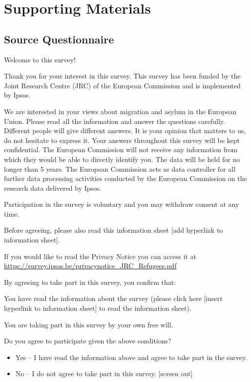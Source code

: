 \documentclass[
  12pt,
  a4paper,
]{article}
\providecommand{\tightlist}{%
  \setlength{\itemsep}{0pt}\setlength{\parskip}{0pt}}
\begin{document}
\newpage

\clearpage

\section{Supporting Materials}\label{supporting-materials}

\subsection{Source Questionnaire}\label{source-questionnaire}

Welcome to this survey!

Thank you for your interest in this survey. This survey has been funded by the Joint Research Centre (JRC) of the European Commission and is implemented by Ipsos.

We are interested in your views about migration and asylum in the European Union. Please read all the information and answer the questions carefully. Different people will give different answers. It is your opinion that matters to us, do not hesitate to express it.
Your answers throughout this survey will be kept confidential. The European Commission will not receive any information from which they would be able to directly identify you. The data will be held for no longer than 5 years. The European Commission acts as data controller for all further data processing activities conducted by the European Commission on the research data delivered by Ipsos.

Participation in the survey is voluntary and you may withdraw consent at any time.

Before agreeing, please also read this information sheet {[}add hyperlink to information sheet{]}.

If you would like to read the Privacy Notice you can access it at \url{https://survey.ipsos.be/privacynotice_JRC_Refugees.pdf}

By agreeing to take part in this survey, you confirm that:

You have read the information about the survey (please click here {[}insert hyperlink to information sheet{]} to read the information sheet).

You are taking part in this survey by your own free will.

Do you agree to participate given the above conditions?

\begin{itemize}
\tightlist
\item
  Yes -- I have read the information above and agree to take part in the survey.
\item
  No -- I do not agree to take part in this survey. {[}screen out{]}
\end{itemize}
\end{document}
